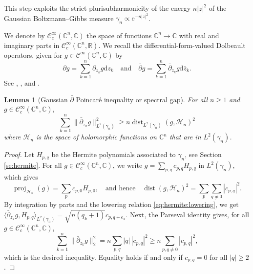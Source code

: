 \documentclass[11pt,reqno]{amsart}
\numberwithin{equation}{section}%
\numberwithin{figure}{section}%
\numberwithin{table}{section}
\theoremstyle{plain}
\newtheorem{lemma}[theorem]{Lemma}
\theoremstyle{definition}
\begin{document}
This step exploits the strict plurisubharmonicity of the energy $n|z|^2$ of
the Gaussian Boltzmann--Gibbs measure $\gamma_n\propto\mathrm{e}^{-n|z|^2}$.

We denote by $\mathcal{C}^\infty_c(\mathbb{C}^n,\mathbb{C})$ the space of
functions $\mathbb{C}^n\to\mathbb{C}$ with real and imaginary parts in
$\mathcal{C}^\infty_c(\mathbb{C}^n,\mathbb{R})$. We recall the
differential-form-valued Dolbeault operators, given for 
$g\in\mathcal{C}^\infty(\mathbb{C}^n,\mathbb{C})$ by
\begin{equation}
  \partial g=\sum_{k=1}^n\partial_{z_k}g\mathrm{d}z_k
  \quad\text{and}\quad
  \bar\partial g=\sum_{k=1}^n\bar\partial_{z_k} g\mathrm{d}\bar{z}_k.
\end{equation}
See \cite{HormanderComplexAnalysisSeveralVariables},
\cite{BerndtssonThingsDbar}, and \cite{demailly}.

\begin{lemma}[Gaussian $\bar\partial$ Poincaré inequality or spectral
  gap]\label{le:dbar-gap}
  For all $n\geq1$ and $g\in\mathcal{C}^\infty_c(\mathbb{C}^n,\mathbb{C})$, 
  \begin{equation}%
    \sum_{k=1}^n\|\bar\partial_{z_k}g\|_{L^2(\gamma_n)}^2
    \geq
    n\operatorname{dist}_{L^2(\gamma_n)}(g,\mathcal{H}_n)^2
  \end{equation}
  where $\mathcal{H}_n$ is the space of holomorphic functions on
  $\mathbb{C}^n$ that are in $L^2(\gamma_n)$.
\end{lemma}

\begin{proof}
  Let $H_{p,q}$ be the Hermite polynomials associated to $\gamma_n$, see
  Section \ref{se:hermite}. For all
  $g\in\mathcal{C}^\infty_c(\mathbb{C}^n,\mathbb{C})$, we write
  $g=\sum_{p,q}c_{p,q}H_{p,q}$ in $L^2(\gamma_n)$, which gives
  \begin{equation}
    \operatorname{proj}_{\mathcal{H}_n}(g)=\sum_p c_{p,0}H_{p,0},
    \quad\text{and hence}\quad
    \operatorname{dist}(g,\mathcal{H}_n)^2
    =\sum_{p}\sum_{q\neq0}|c_{p,q}|^2.
  \end{equation}
  By integration by parts and the lowering relation
  \eqref{eq:hermite:lowering}, we get
  $\langle\bar\partial_{z_k}g,H_{p,q}\rangle_{L^2(\gamma_n)}=\sqrt{n(q_k+1)}c_{p,q+e_k}$.
  Next, the Parseval identity gives, for all
  $g\in\mathcal{C}^\infty_c(\mathbb{C}^n,\mathbb{C})$,
  \begin{equation}
    \sum_{k=1}^n\|\bar\partial_{z_k}g\|_2^2
    =n\sum_{p,q}|q|\,|c_{p,q}|^2
    \ge n\sum_{p,q\neq0}|c_{p,q}|^2,
  \end{equation}
  which is the desired inequality. Equality holds if and only if $c_{p,q}=0$
  for all $|q|\ge2$.
\end{proof}
\end{document}
